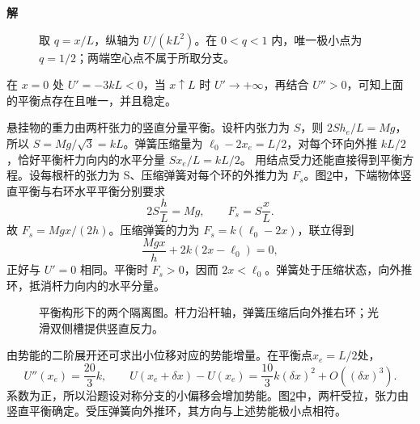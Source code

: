 \documentclass[11pt,openany,fontset=fandol]{ctexbook}
\theoremstyle{definition}\newtheorem{example}{例}[chapter]\newtheorem{exercise}{习题}[chapter]
\newcommand{\SolutionStart}{\par\medskip\ifdim\pagetotal>0pt\ifdim\dimexpr\pagegoal-\pagetotal\relax<3\baselineskip\newpage\fi\fi\noindent\textbf{解}\quad\ignorespaces}
\newenvironment{solution}{\SolutionStart}{\par\medskip}
\begin{document}
\begin{solution}
\begin{figure}[H]
\caption{取 $q=x/L$，纵轴为 $U/(kL^2)$。在 $0<q<1$ 内，唯一极小点为 $q=1/2$；两端空心点不属于所取分支。}\label{mp5:fig:l5-h6-s}
\end{figure}

在 $x=0$ 处 $U'=-3kL<0$，当 $x\uparrow L$ 时 $U'\to+\infty$，再结合 $U''>0$，可知上面的平衡点存在且唯一，并且稳定。

悬挂物的重力由两杆张力的竖直分量平衡。设杆内张力为 $S$，则 $2S h_e/L=Mg$，所以 $S=Mg/\sqrt3=kL$。弹簧压缩量为 $\ell_0-2x_e=L/2$，对每个环向外推 $kL/2$，恰好平衡杆力向内的水平分量 $Sx_e/L=kL/2$。
用结点受力还能直接得到平衡方程。设每根杆的张力为 S、压缩弹簧对每个环的外推力为 $F_s$。图\ref{mp5:fig:l5-h6-force}中，下端物体竖直平衡与右环水平平衡分别要求
\[
2S\frac hL=Mg,\qquad F_s=S\frac xL.
\]
故 $F_s=Mgx/(2h)$。压缩弹簧的力为 $F_s=k(\ell_0-2x)$，联立得到
\[
\frac{Mgx}{h}+2k(2x-\ell_0)=0,
\]
正好与 $U'=0$ 相同。平衡时 $F_s>0$，因而 $2x<\ell_0$。弹簧处于压缩状态，向外推环，抵消杆力向内的水平分量。
\begin{figure}[H]\centering
{}
\caption{平衡构形下的两个隔离图。杆力沿杆轴，弹簧压缩后向外推右环；光滑双侧槽提供竖直反力。}\label{mp5:fig:l5-h6-force}
\end{figure}

由势能的二阶展开还可求出小位移对应的势能增量。在平衡点$x_e=L/2$处，
\[
 U''(x_e)=\frac{20}{3}k,
 \qquad U(x_e+\delta x)-U(x_e)=\frac{10}{3}k(\delta x)^2+O((\delta x)^3).
\]
系数为正，所以沿题设对称分支的小偏移会增加势能。图\ref{mp5:fig:l5-h6-force}中，两杆受拉，张力由竖直平衡确定。受压弹簧向外推环，其方向与上述势能极小点相符。
\end{solution}
\end{document}
